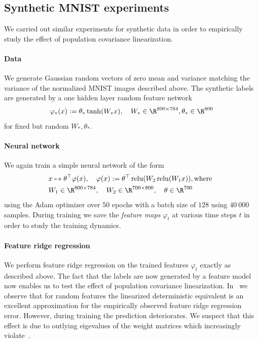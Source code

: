 \subsection{Synthetic MNIST experiments}\label{synth MNIST}
We carried out similar experiments for synthetic data in order to empirically study the effect of population covariance linearization. 

\paragraph{Data}
We generate Gaussian random vectors of zero mean and variance matching the variance of the normalized MNIST images described above. The synthetic labels are generated by a one hidden layer random feature network 
\[ \varphi_\ast(x):= \theta_\ast \tanh(W_\ast x), \quad W_\ast\in\R^{800\times 784}, \theta_\ast\in\R^{800} \]
for fixed but random $W_\ast,\theta_\ast$. 

\paragraph{Neural network}
We again train a simple neural network of the form 
\begin{equation}
    \begin{aligned}
    &x\mapsto \theta^\top\varphi(x), \quad \varphi(x):=\theta^\top\operatorname{relu}(W_2 \operatorname{relu}( W_1 x)), \text{where }\\
    &W_1\in\R^{800\times 784},\quad W_2\in\R^{700\times 800}, \quad \theta\in\R^{700}
    \end{aligned}
\end{equation}
using the Adam optimizer over $50$ epochs with a batch size of $128$ using $40\ 000$ samples. During training we save the \emph{feature maps} $\varphi_t$ at various time steps $t$ in order to study the training dynamics. 

\paragraph{Feature ridge regression} We perform feature ridge regression on the trained features $\varphi_t$ exactly as described above. The fact that the labels are now generated by a feature model now enables us to test the effect of population covariance linearization. In~ we observe that for random features the linearized deterministic equivalent is an excellent approximation for the empirically observed feature ridge regression error. However, during training the prediction deteriorates. We suspect that this effect is due to outlying eigevalues of the weight matrices which increasingly violate~.  

